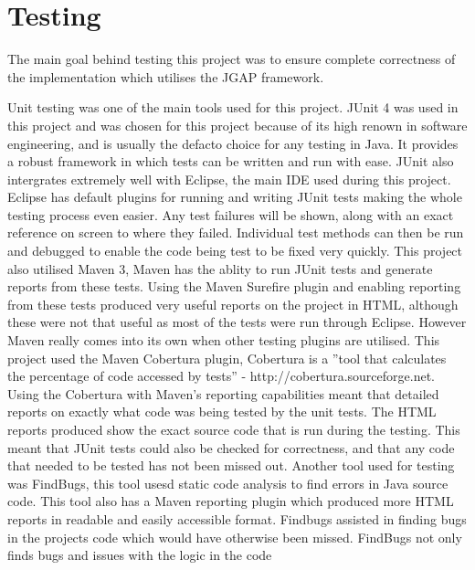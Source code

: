 \documentclass[12pt]{article}
\begin{document}






\section{Testing}
The main goal behind testing this project was to ensure complete correctness of the implementation which utilises the JGAP framework.

Unit testing was one of the main tools used for this project. JUnit 4 was used in this project and was chosen for this project because
of its high renown in software engineering, and is usually the defacto choice for any testing in Java. It provides a robust framework
in which tests can be written and run with ease. JUnit also intergrates extremely well with Eclipse, the main IDE used during this project. Eclipse has default plugins for running and writing JUnit tests making the whole testing process even easier. Any test
failures will be shown, along with an exact reference on screen to where they failed. Individual test methods can then be run and
debugged to enable the code being test to be fixed very quickly.
This project also utilised Maven 3, Maven has the ablity to run JUnit tests and generate reports from these tests. Using the Maven
Surefire plugin and enabling reporting from these tests produced very useful reports on the project in HTML, although these were not
that useful as most of the tests were run through Eclipse. However Maven really comes into its own when other testing plugins are
utilised. This project used the Maven Cobertura plugin, Cobertura is a ''tool that calculates the percentage of code accessed by 
tests'' - http://cobertura.sourceforge.net. Using the Cobertura with Maven's reporting capabilities meant that detailed reports
on exactly what code was being tested by the unit tests. The HTML reports produced show the exact source code that is run during the
testing. This meant that JUnit tests could also be checked for correctness, and that any code that needed to be tested has not been
missed out.
Another tool used for testing was FindBugs, this tool usesd static code analysis to find errors in Java source code. This tool also
has a Maven reporting plugin which produced more HTML reports in readable and easily accessible format. Findbugs assisted in finding bugs in the projects code which would have otherwise been missed. FindBugs not only finds bugs and issues with the logic in the code
\end{document}
